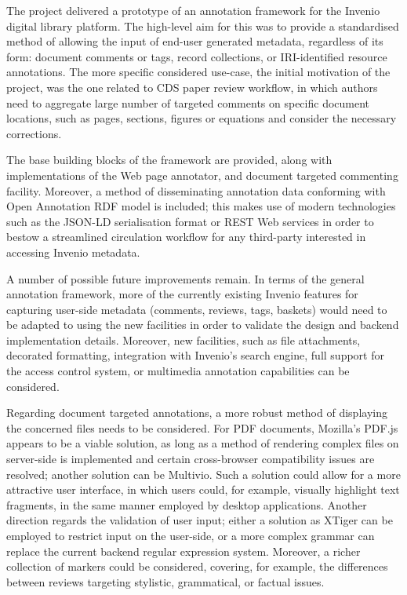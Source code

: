 
The project delivered a prototype of an annotation framework for the Invenio
digital library platform. The high-level aim for this was to provide a
standardised method of allowing the input of end-user generated metadata,
regardless of its form: document comments or tags, record collections, or
IRI-identified resource annotations. The more specific considered use-case, the
initial motivation of the project, was the one related to CDS paper review
workflow, in which authors need to aggregate large number of targeted comments
on specific document locations, such as pages, sections, figures or equations and
consider the necessary corrections.

The base building blocks of the framework are provided, along with
implementations of the Web page annotator, and document targeted commenting
facility. Moreover, a method of disseminating annotation data conforming with
Open Annotation RDF model is included; this makes use of modern
technologies such as the JSON-LD serialisation format or REST Web services in
order to bestow a streamlined circulation workflow for any third-party
interested in accessing Invenio metadata.

A number of possible future improvements remain. In terms of the general
annotation framework, more of the currently existing Invenio features for
capturing user-side metadata (comments, reviews, tags, baskets) would need to
be adapted to using the new facilities in order to validate the design and
backend implementation details. Moreover, new facilities, such as file
attachments, decorated formatting, integration with Invenio's search engine,
full support for the access control system, or multimedia annotation
capabilities can be considered.

Regarding document targeted annotations, a more robust method of displaying the
concerned files needs to be considered. For PDF documents, Mozilla's PDF.js
appears to be a viable solution, as long as a method of rendering complex files
on server-side is implemented and certain cross-browser compatibility issues
are resolved; another solution can be Multivio. Such a solution could allow for
a more attractive user interface, in which users could, for example, visually
highlight text fragments, in the same manner employed by desktop applications.
Another direction regards the validation of user input; either a solution as
XTiger can be employed to restrict input on the user-side, or a more complex
grammar can replace the current backend regular expression system. Moreover, a
richer collection of markers could be considered, covering, for example, the
differences between reviews targeting stylistic, grammatical, or factual issues.

